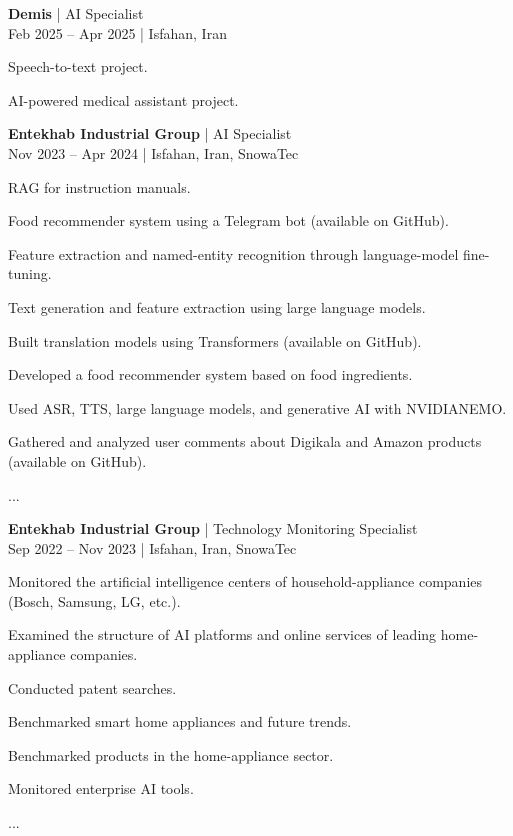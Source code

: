 \documentclass[a4paper]{deedy-resume}
\begin{document}
\begin{minipage}[t]{0.62\textwidth}
\textbf{Demis} | AI Specialist \\
\vspace{\itemsep}
Feb 2025 – Apr 2025 | Isfahan, Iran
\begin{tightitemize}
\item Speech-to-text project.
\item AI-powered medical assistant project.
\end{tightitemize}
\vspace{\topsep}

\textbf{Entekhab Industrial Group} | AI Specialist \\
\vspace{\itemsep}
Nov 2023 – Apr 2024 | Isfahan, Iran, SnowaTec
\begin{tightitemize}
\item RAG for instruction manuals.
\item Food recommender system using a Telegram bot (available on GitHub).
\item Feature extraction and named-entity recognition through language-model fine-tuning.
\item Text generation and feature extraction using large language models.
\item Built translation models using Transformers (available on GitHub).
\item Developed a food recommender system based on food ingredients.
\item Used ASR, TTS, large language models, and generative AI with NVIDIA\texttrademark NEMO.
\item Gathered and analyzed user comments about Digikala and Amazon products (available on GitHub).
\item ...
\end{tightitemize}
\vspace{\topsep}

\textbf{Entekhab Industrial Group} | Technology Monitoring Specialist \\
\vspace{\itemsep}
Sep 2022 – Nov 2023 | Isfahan, Iran, SnowaTec
\begin{tightitemize}
\item Monitored the artificial intelligence centers of household-appliance companies (Bosch, Samsung, LG, etc.).
\item Examined the structure of AI platforms and online services of leading home-appliance companies.
\item Conducted patent searches.
\item Benchmarked smart home appliances and future trends.
\item Benchmarked products in the home-appliance sector.
\item Monitored enterprise AI tools.
\item ...
\end{tightitemize}

\end{minipage}
\end{document}
